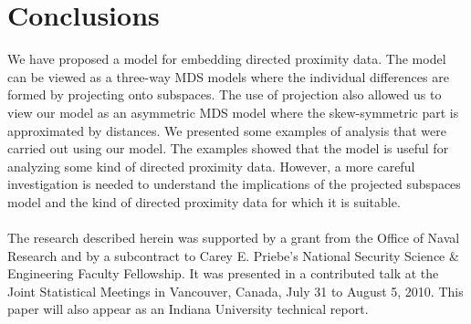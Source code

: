 \documentclass[11pt]{asaproc}
\begin{document}
\section{Conclusions}
\label{sec:conclusions}
We have proposed a model for embedding directed proximity data. The
model can be viewed as a three-way MDS models where the individual
differences are formed by projecting onto subspaces. The use of
projection also allowed us to view our model as an asymmetric MDS
model where the skew-symmetric part is approximated by distances. We
presented some examples of analysis that were carried out using our
model. The examples showed that the model is useful for analyzing some
kind of directed proximity data. However, a more careful investigation
is needed to understand the implications of the projected subspaces
model and the kind of directed proximity data for which it is
suitable. \\ \\
 The research described herein was 
supported by a grant from the 
Office of Naval Research and by a subcontract to
Carey E. Priebe's 
National Security Science \& Engineering Faculty Fellowship.
It was presented in a contributed talk at the Joint Statistical Meetings 
in Vancouver, Canada, July 31 to August 5, 2010.  
This paper will also appear as an Indiana University technical report.

\end{document}
